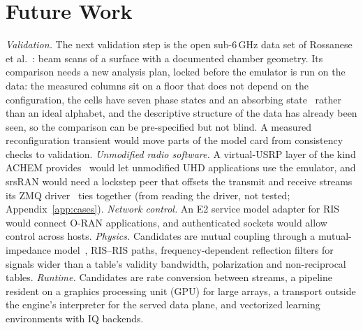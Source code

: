 \section{Future Work}\label{sec:future}

\emph{Validation.} The next validation step is the open sub-6\,GHz
data set of Rossanese et al.~\cite{Rossanese2024OpenMeas}: beam scans of a surface with a
documented chamber geometry. Its comparison needs a new analysis plan, locked before the
emulator is run on the data: the measured columns sit on a floor that does not depend on the
configuration, the cells have seven phase states and an absorbing
state~\cite{Rossanese2022WiNTECH} rather than an ideal alphabet, and the descriptive structure
of the data has already been seen, so the comparison can be pre-specified but not blind. A
measured reconfiguration transient would move parts of the model card from consistency
checks to validation. \emph{Unmodified radio software.} A virtual-USRP layer of the kind ACHEM
provides~\cite{Gurses2026ACHEM} would let unmodified UHD applications use the emulator, and
srsRAN would need a lockstep peer that offsets the transmit and receive streams its ZMQ
driver~\cite{srsRANZMQ} ties together (from reading the driver, not tested;
Appendix~\ref{app:cases}). \emph{Network control.} An E2 service model adapter for
RIS~\cite{ElGhalbzouri2025GoSimRIS,Kayraklik2026ORIX} would connect O-RAN applications, and
authenticated sockets would allow control across hosts. \emph{Physics.} Candidates are mutual
coupling through a mutual-impedance model~\cite{Gradoni2021MutualCoupling}, RIS--RIS paths, frequency-dependent
reflection filters for signals wider than a table's validity bandwidth, polarization and
non-reciprocal tables. \emph{Runtime.} Candidates are rate conversion between streams, a pipeline resident on
a graphics processing unit (GPU) for large arrays, a transport outside the engine's
interpreter for the served data plane, and vectorized learning environments with IQ backends.
